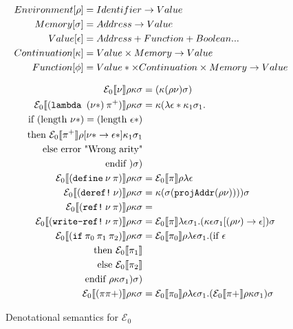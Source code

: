 \begin{figure}[H]
\begin{align*}
    Environment [\rho] &= Identifier \rightarrow Value \\
    Memory [\sigma] &= Address \rightarrow Value \\
    Value [\epsilon] &= Address + Function + Boolean ... \\
    Continuation [\kappa] &= Value \times Memory \rightarrow Value \\
    Function [\phi] &= Value* \times Continuation \times Memory \rightarrow Value
\end{align*}
\label{f:denotationalsemleged}
\end{figure}


\begin{figure}[H]
\begin{align*}
    \denotationdesc{0}{\variable}{(\cont (\env \variable) \mem)} \\
    \denotationdesc{0}{(\lam (\variable *)\: \pi^{+})}{
      \cont (\lambda \val * \cont_1 \mem_1 . \\
        \text{if } (\text{length } \variable *) = (\text{length } \val *) \\
        \text{then } \denotation{0}{\pi^{+}}\env[\variable * \rightarrow} \val * ] \cont_1 \mem_1 \\
        \text{else } \text{error "Wrong arity"} \\
        \text{endif } ) \mem ) \\
    \denotationdesc{0}{(\define \: \variable \: \pi )}{
      \denotation{0}{\pi}\env \lambda \val
    } \\
    \denotationdesc{0}{(\deref \: \variable  )}{\cont (\mem (\texttt{projAddr}(\env \variable)))) \mem} \\
  \denotationdesc{0}{(\mkref \: \variable \: \pi)}{} \\
  \denotationdesc{0}{(\writeref \: \variable \: \pi)}{
      \denotation{0}{\pi} \lambda \val \mem_1 . (\cont \val \mem_1 [(\env
      \variable) \rightarrow \val]) \mem } \\
  \denotationdesc{0}{(\ifm \: \pi_0 \: \pi_1 \: \pi_2)}{\denotation{0}{\pi_0}\env
    \lambda \val \mem_1 .(\text{if } \val  \\
    \text{then } \denotation{0}{\pi_1}  \\
    \text{else } \denotation{0}{\pi_2} \\
    \text{endif } \env \cont \mem_1)  \mem ) } \\
  \denotationdesc{0}{(\pi \pi+ )}{
      \denotation{0}{\pi_0}\env \lambda \val \mem_1 . (\denotation{0}{\pi+}
      \env \cont \mem_1) \mem
  }
\end{align*}
\caption{Denotational semantics for $\mathcal{E}_{0}$}
\label{f:denotationalsem0}
\end{figure}

